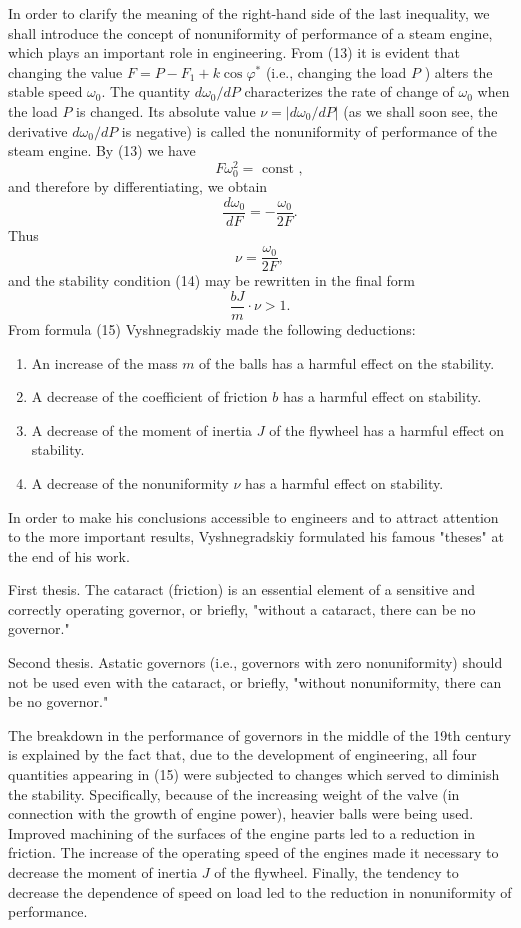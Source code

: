 \documentclass[10pt,a5paper]{book}
\theoremstyle{plain}
\theoremstyle{definition}
\theoremstyle{remark}
\begin{document}
In order to clarify the meaning of the right-hand side of the last inequality, we shall introduce the concept of nonuniformity of performance of a steam engine, which plays an important role in engineering. From (13) it is evident that changing the value $F=P-F_{1}+k \cos \varphi^{*}$ (i.e., changing the load $P$ ) alters the stable speed $\omega_{0}$. The quantity $d \omega_{0} / d P$ characterizes the rate of change of $\omega_{0}$ when the load $P$ is changed. Its absolute value $\nu=\left|d \omega_{0} / d P\right|$ (as we shall soon see, the derivative $d \omega_{0} / d P$ is negative) is called the nonuniformity of performance of the steam engine. By (13) we have
\[
F \omega_{0}^{2}=\text { const },
\]
and therefore by differentiating, we obtain
\[
\frac{d \omega_{0}}{d F}=-\frac{\omega_{0}}{2 F} .
\]
Thus
\[
\nu=\frac{\omega_{0}}{2 F},
\]
and the stability condition (14) may be rewritten in the final form
\begin{equation*}
\frac{b J}{m} \cdot \nu>1 . \tag{15}
\end{equation*}
From formula (15) Vyshnegradskiy made the following deductions:

\begin{enumerate}
  \item An increase of the mass $m$ of the balls has a harmful effect on the stability.
  \item A decrease of the coefficient of friction $b$ has a harmful effect on stability.
  \item A decrease of the moment of inertia $J$ of the flywheel has a harmful effect on stability.
  \item A decrease of the nonuniformity $\nu$ has a harmful effect on stability.
\end{enumerate}

In order to make his conclusions accessible to engineers and to attract attention to the more important results, Vyshnegradskiy formulated his famous "theses" at the end of his work.

First thesis. The cataract (friction) is an essential element of a sensitive and correctly operating governor, or briefly, "without a cataract, there can be no governor."

Second thesis. Astatic governors (i.e., governors with zero nonuniformity) should not be used even with the cataract, or briefly, "without nonuniformity, there can be no governor."

The breakdown in the performance of governors in the middle of the 19th century is explained by the fact that, due to the development of engineering, all four quantities appearing in (15) were subjected to changes which served to diminish the stability. Specifically, because of the increasing weight of the valve (in connection with the growth of engine power), heavier balls were being used. Improved machining of the surfaces of the engine parts led to a reduction in friction. The increase of the operating speed of the engines made it necessary to decrease the moment of inertia $J$ of the flywheel. Finally, the tendency to decrease the dependence of speed on load led to the reduction in nonuniformity of performance.
\end{document}
